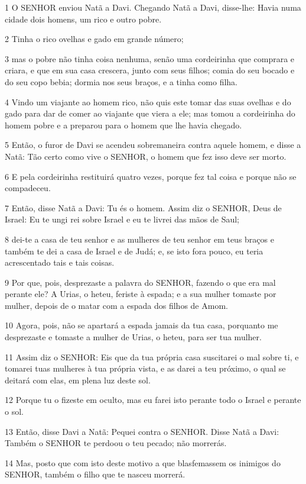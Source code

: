 \par 1 O SENHOR enviou Natã a Davi. Chegando Natã a Davi, disse-lhe: Havia numa cidade dois homens, um rico e outro pobre.
\par 2 Tinha o rico ovelhas e gado em grande número;
\par 3 mas o pobre não tinha coisa nenhuma, senão uma cordeirinha que comprara e criara, e que em sua casa crescera, junto com seus filhos; comia do seu bocado e do seu copo bebia; dormia nos seus braços, e a tinha como filha.
\par 4 Vindo um viajante ao homem rico, não quis este tomar das suas ovelhas e do gado para dar de comer ao viajante que viera a ele; mas tomou a cordeirinha do homem pobre e a preparou para o homem que lhe havia chegado.
\par 5 Então, o furor de Davi se acendeu sobremaneira contra aquele homem, e disse a Natã: Tão certo como vive o SENHOR, o homem que fez isso deve ser morto.
\par 6 E pela cordeirinha restituirá quatro vezes, porque fez tal coisa e porque não se compadeceu.
\par 7 Então, disse Natã a Davi: Tu és o homem. Assim diz o SENHOR, Deus de Israel: Eu te ungi rei sobre Israel e eu te livrei das mãos de Saul;
\par 8 dei-te a casa de teu senhor e as mulheres de teu senhor em teus braços e também te dei a casa de Israel e de Judá; e, se isto fora pouco, eu teria acrescentado tais e tais coisas.
\par 9 Por que, pois, desprezaste a palavra do SENHOR, fazendo o que era mal perante ele? A Urias, o heteu, feriste à espada; e a sua mulher tomaste por mulher, depois de o matar com a espada dos filhos de Amom.
\par 10 Agora, pois, não se apartará a espada jamais da tua casa, porquanto me desprezaste e tomaste a mulher de Urias, o heteu, para ser tua mulher.
\par 11 Assim diz o SENHOR: Eis que da tua própria casa suscitarei o mal sobre ti, e tomarei tuas mulheres à tua própria vista, e as darei a teu próximo, o qual se deitará com elas, em plena luz deste sol.
\par 12 Porque tu o fizeste em oculto, mas eu farei isto perante todo o Israel e perante o sol.
\par 13 Então, disse Davi a Natã: Pequei contra o SENHOR. Disse Natã a Davi: Também o SENHOR te perdoou o teu pecado; não morrerás.
\par 14 Mas, posto que com isto deste motivo a que blasfemassem os inimigos do SENHOR, também o filho que te nasceu morrerá.
